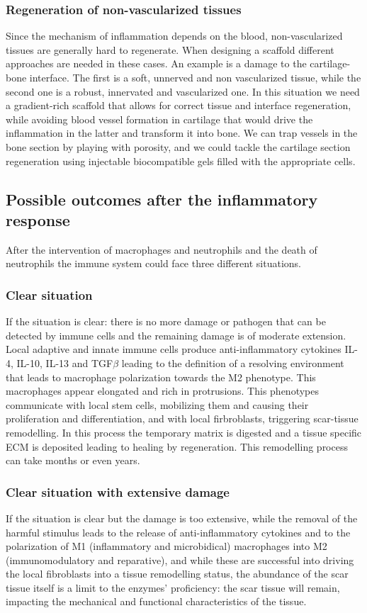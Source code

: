 		\subsubsection{Regeneration of non-vascularized tissues}
		Since the mechanism of inflammation depends on the blood, non-vascularized tissues are generally hard to regenerate.
		When designing a scaffold different approaches are needed in these cases.
		An example is a damage to the cartilage-bone interface.
		The first is a soft, unnerved and non vascularized tissue, while the second one is a robust, innervated and vascularized one.
		In this situation we need a gradient-rich scaffold that allows for correct tissue and interface regeneration, while avoiding blood vessel formation in cartilage that would drive the inflammation in the latter and transform it into bone.
		We can trap vessels in the bone section by playing with porosity, and we could tackle the cartilage section regeneration using injectable biocompatible gels filled with the appropriate cells.

	\subsection{Possible outcomes after the inflammatory response}
	After the intervention of macrophages and neutrophils and the death of neutrophils the immune system could face three different situations.

		\subsubsection{Clear situation}
		If the situation is clear: there is no more damage or pathogen that can be detected by immune cells and the remaining damage is of moderate extension.
		Local adaptive and innate immune cells produce anti-inflammatory cytokines IL-4, IL-10, IL-13 and TGF$\beta$ leading to the definition of a resolving environment that leads to macrophage polarization towards the M2 phenotype.
		This macrophages appear elongated and rich in protrusions.
		This phenotypes communicate with local stem cells, mobilizing them and causing their proliferation and differentiation, and with local firbroblasts, triggering scar-tissue remodelling.
		In this process the temporary matrix is digested and a tissue specific ECM is deposited leading to healing by regeneration.
		This remodelling process can take months or even years.

		\subsubsection{Clear situation with extensive damage}
		If the situation is clear but the damage is too extensive, while the removal of the harmful stimulus leads to the release of anti-inflammatory cytokines and to the polarization of M1 (inflammatory and microbidical) macrophages into M2 (immunomodulatory and reparative), and while these are successful into driving the local fibroblasts into a tissue remodelling status, the abundance of the scar tissue itself is a limit to the enzymes’ proficiency: the scar tissue will remain, impacting the mechanical and functional characteristics of the tissue.


